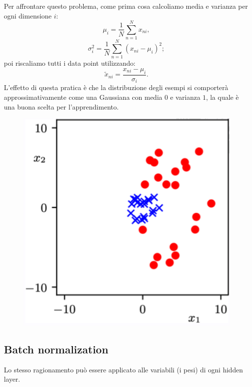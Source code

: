 Per affrontare questo problema, come prima cosa calcoliamo media e varianza per ogni dimensione $i$:
\begin{equation}
    \mu_i=\frac{1}{N}\sum^N_{n=1}x_{ni},
\end{equation}
\begin{equation}
    \sigma^2_i=\frac{1}{N}\sum^N_{n=1}(x_{ni}-\mu_i)^2;
\end{equation}
poi riscaliamo tutti i data point utilizzando:
\begin{equation}
    \tilde{x}_{ni}=\frac{x_{ni}-\mu_i}{\sigma_i}.
\end{equation}
L'effetto di questa pratica è che la distribuzione degli esempi si comporterà approssimativamente come una Gaussiana con media $0$ e varianza $1$, la quale è una buona scelta per l'apprendimento.
\begin{figure}[h]
    \includegraphics[scale=.25]{images/best_practices/data_norm.png}
    \centering
\end{figure}
\newpage
\subsection{Batch normalization}
Lo stesso ragionamento può essere applicato alle variabili (i pesi) di ogni hidden layer. 



